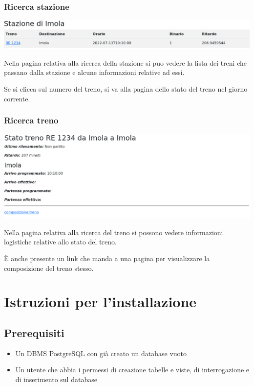 \documentclass[a4paper,12pt]{report}
\begin{document}
	\subsection{Ricerca stazione}
	\includegraphics[width=\linewidth]{res/screenshots/stazione.png}
	\par Nella pagina relativa alla ricerca della stazione si puo vedere la lista dei treni che passano dalla stazione e alcune informazioni relative ad essi.
	\par Se si clicca sul numero del treno, si va alla pagina dello stato del treno nel giorno corrente.
	\subsection{Ricerca treno}
	\includegraphics[width=\linewidth]{res/screenshots/stato_treno.png}
	\par Nella pagina relativa alla ricerca del treno si possono vedere informazioni logistiche relative allo stato del treno.
	\par \`E anche presente un link che manda a una pagina per visualizzare la composizione del treno stesso.
	\appendix
	\chapter{Istruzioni per l'installazione}
	\section{Prerequisiti}
	\begin{itemize}
		\item Un DBMS PostgreSQL con già creato un database vuoto
		\item Un utente che abbia i permessi di creazione tabelle e viste, di interrogazione e di inserimento sul database
	\end{itemize}
\end{document}
